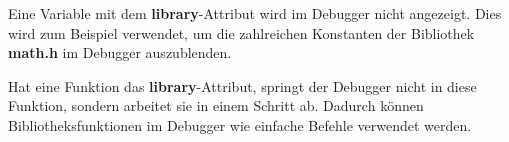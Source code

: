Eine Variable mit dem \textbf{library}-Attribut wird im Debugger nicht angezeigt. Dies wird zum Beispiel verwendet, um die zahlreichen Konstanten der Bibliothek \textbf{math.h} im Debugger auszublenden.

Hat eine Funktion das \textbf{library}-Attribut, springt der Debugger nicht in diese Funktion, sondern arbeitet sie in einem Schritt ab. Dadurch können Bibliotheksfunktionen im Debugger wie einfache Befehle verwendet werden.

